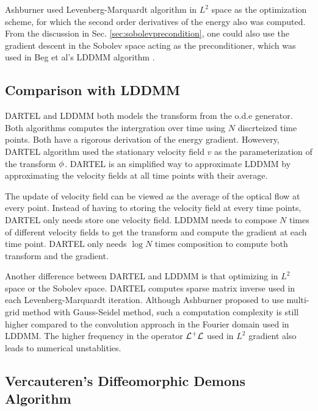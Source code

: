 \documentclass[letterpaper,12pt]{article}
\begin{document}
Ashburner used Levenberg-Marquardt algorithm in $L^2$ space as the optimization scheme, for which the second order derivatives of the energy also was computed. From the discussion in Sec. \ref{sec:sobolevprecondition}, one could also use the gradient descent in the Sobolev space acting as the preconditioner, which was used in Beg et al's LDDMM algorithm \cite{Beg2005Computing}. 

\subsection{Comparison with LDDMM}

DARTEL and LDDMM both models the transform from the o.d.e generator. Both algorithms computes the intergration over time using $N$ discrteized time points. Both have a rigorous derivation of the energy gradient. 
Howevery, DARTEL algorithm used the stationary velocity field $v$ as the parameterization of the transform $\phi$. DARTEL is an simplified way to approximate LDDMM by approximating the velocity fields at all time points with their average.

The update of velocity field can be viewed as the average of the optical flow at every point. Instead of having to storing the velocity field at every time points, DARTEL only needs store one velocity field. LDDMM needs to compose $N$ times of different velocity fields to get the transform and compute the gradient at each time point. DARTEL only needs $\log N$ times composition to compute both transform and the gradient. 

Another difference between DARTEL and LDDMM is that optimizing in $L^2$ space or the Sobolev space. DARTEL computes sparse matrix inverse used in each Levenberg-Marquardt iteration. Although Ashburner proposed to use multi-grid method with Gauss-Seidel method, such a computation complexity is still higher compared to the convolution approach in the Fourier domain used in LDDMM. The higher frequency in the operator $\mathcal{L}^+\mathcal{L}$ used in $L^2$ gradient also leads to numerical unstablities.



\subsection{Vercauteren's Diffeomorphic Demons Algorithm}
\end{document}
